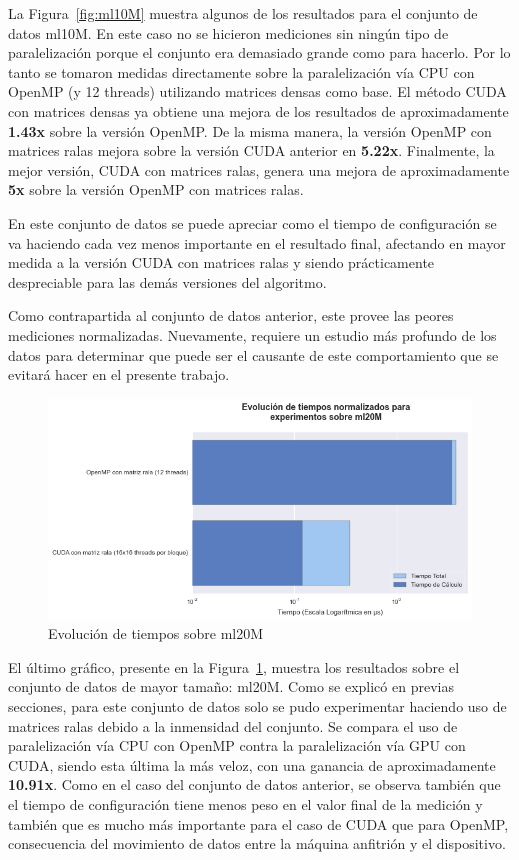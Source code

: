 \documentclass[11pt, a4paper]{article}
\begin{document}
  La Figura~\ref{fig:ml10M} muestra algunos de los resultados para el conjunto
  de datos ml10M. En este caso no se hicieron mediciones sin ningún tipo de
  paralelización porque el conjunto era demasiado grande como para hacerlo. Por
  lo tanto se tomaron medidas directamente sobre la paralelización vía CPU con
  OpenMP (y 12 threads) utilizando matrices densas como base.  El método CUDA
  con matrices densas ya obtiene una mejora de los resultados de
  aproximadamente {\bf 1.43x} sobre la versión OpenMP. De la misma manera, la
  versión OpenMP con matrices ralas mejora sobre la versión CUDA anterior en
  {\bf 5.22x}. Finalmente, la mejor versión, CUDA con matrices ralas, genera
  una mejora de aproximadamente {\bf 5x} sobre la versión OpenMP con matrices
  ralas.

  En este conjunto de datos se puede apreciar como el tiempo de configuración
  se va haciendo cada vez menos importante en el resultado final, afectando en
  mayor medida a la versión CUDA con matrices ralas y siendo prácticamente
  despreciable para las demás versiones del algoritmo.

  Como contrapartida al conjunto de datos anterior, este provee las peores
  mediciones normalizadas. Nuevamente, requiere un estudio más profundo de los
  datos para determinar que puede ser el causante de este comportamiento que se
  evitará hacer en el presente trabajo.
 
  \begin{figure}[ht]
      \centering
      \includegraphics[width=\textwidth]{plots/ml20M.png}
      \caption{Evolución de tiempos sobre ml20M}\label{fig:ml20M}
  \end{figure}

  El último gráfico, presente en la Figura~\ref{fig:ml20M}, muestra los
  resultados sobre el conjunto de datos de mayor tamaño: ml20M. Como se explicó
  en previas secciones, para este conjunto de datos solo se pudo experimentar
  haciendo uso de matrices ralas debido a la inmensidad del conjunto. Se
  compara el uso de paralelización vía CPU con OpenMP contra la paralelización
  vía GPU con CUDA, siendo esta última la más veloz, con una ganancia de
  aproximadamente {\bf 10.91x}. Como en el caso del conjunto de datos anterior,
  se observa también que el tiempo de configuración tiene menos peso en el
  valor final de la medición y también que es mucho más importante para el caso
  de CUDA que para OpenMP, consecuencia del movimiento de datos entre la
  máquina anfitrión y el dispositivo.
\end{document}
